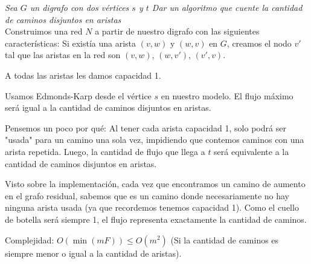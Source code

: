 \documentclass{article}
\begin{document}
\textit{Sea \( G \) un digrafo con dos vértices \( s \) y \( t \) Dar un algoritmo que cuente la cantidad de caminos disjuntos en aristas } \\

Construimos una red \( N \) a partir de nuestro digrafo con las siguientes características:
Si existía una arista \( (v, w) \) y \( (w, v) \) en \( G \), creamos el nodo \( v' \) tal que las aristas en la red son \( (v, w) \), \( (w, v') \), \( (v', v) \).

\hspace{1cm}




A todas las aristas les damos capacidad 1.

Usamos Edmonds-Karp desde el vértice \( s \) en nuestro modelo. El flujo máximo será igual a la cantidad de caminos disjuntos en aristas.

Pensemos un poco por qué: Al tener cada arista capacidad 1, solo podrá ser "usada" para un camino una sola vez, impidiendo que contemos caminos con una arista repetida. Luego, la cantidad de flujo que llega a \( t \) será equivalente a la cantidad de caminos disjuntos en aristas.

Visto sobre la implementación, cada vez que encontramos un camino de aumento en el grafo residual, sabemos que es un camino donde necesariamente no hay ninguna arista usada (ya que recordemos tenemos capacidad 1). Como el cuello de botella será siempre 1, el flujo representa exactamente la cantidad de caminos.

Complejidad: \( O(\min(mF)) \leq O(m^2) \) (Si la cantidad de caminos es siempre menor o igual a la cantidad de aristas).
\end{document}
